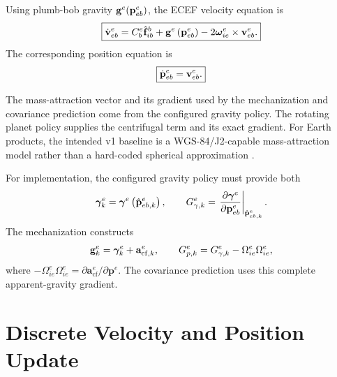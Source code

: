Using plumb-bob gravity $\mathbf{g}^{e}(\mathbf{p}_{eb}^{e})$, the ECEF velocity equation is
\begin{equation}
\boxed{
\dot{\mathbf{v}}_{eb}^{e}
=
C_b^e\hat{\mathbf{f}}_{ib}^{b}
+
\mathbf{g}^{e}\left(\mathbf{p}_{eb}^{e}\right)
-
2\boldsymbol{\omega}_{ie}^{e}\times\mathbf{v}_{eb}^{e}.
}
\label{eq:v1_velocity_mechanization}
\end{equation}
The corresponding position equation is
\begin{equation}
\boxed{
\dot{\mathbf{p}}_{eb}^{e}
=
\mathbf{v}_{eb}^{e}.
}
\end{equation}

The mass-attraction vector and its gradient used by the mechanization and
covariance prediction come from the configured gravity policy. The rotating
planet policy supplies the centrifugal term and its exact gradient. For Earth
products, the intended v1 baseline is a WGS-84/J2-capable mass-attraction model
rather than a hard-coded spherical approximation \cite{groves2013}.

For implementation, the configured gravity policy must provide both
\begin{equation}
\boldsymbol{\gamma}_k^e
=
\boldsymbol{\gamma}^e\left(\hat{\mathbf{p}}_{eb,k}^{e}\right),
\qquad
G_{\gamma,k}^{e}
=
\left.
\frac{\partial\boldsymbol{\gamma}^e}{\partial\mathbf{p}_{eb}^{e}}
\right|_{\hat{\mathbf{p}}_{eb,k}^{e}}.
\label{eq:v1_gravity_policy_contract}
\end{equation}
The mechanization constructs
\begin{equation}
\mathbf{g}_k^e
=
\boldsymbol{\gamma}_k^e+\mathbf{a}_{\mathrm{cf},k}^e,
\qquad
G_{p,k}^{e}
=
G_{\gamma,k}^{e}
-
\Omega_{ie}^{e}\Omega_{ie}^{e},
\label{eq:v1_apparent_gravity_gradient}
\end{equation}
where
$-\Omega_{ie}^{e}\Omega_{ie}^{e}
=\partial\mathbf{a}_{\mathrm{cf}}^e/\partial\mathbf{p}^e$.
The covariance prediction uses this complete apparent-gravity gradient.

\section{Discrete Velocity and Position Update}

